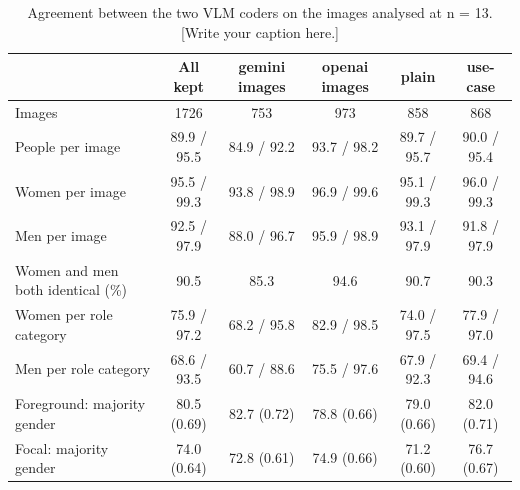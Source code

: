 \begin{table}[t]
\centering
\scriptsize

\begin{tabular}{@{}lccccc@{}}
\toprule
 & \textbf{All kept} & \textbf{gemini images} & \textbf{openai images} & \textbf{plain} & \textbf{use-case} \\
\midrule
Images & 1726 & 753 & 973 & 858 & 868 \\
People per image & 89.9 / 95.5 & 84.9 / 92.2 & 93.7 / 98.2 & 89.7 / 95.7 & 90.0 / 95.4 \\
Women per image & 95.5 / 99.3 & 93.8 / 98.9 & 96.9 / 99.6 & 95.1 / 99.3 & 96.0 / 99.3 \\
Men per image & 92.5 / 97.9 & 88.0 / 96.7 & 95.9 / 98.9 & 93.1 / 97.9 & 91.8 / 97.9 \\
Women and men both identical (\%) & 90.5 & 85.3 & 94.6 & 90.7 & 90.3 \\
Women per role category & 75.9 / 97.2 & 68.2 / 95.8 & 82.9 / 98.5 & 74.0 / 97.5 & 77.9 / 97.0 \\
Men per role category & 68.6 / 93.5 & 60.7 / 88.6 & 75.5 / 97.6 & 67.9 / 92.3 & 69.4 / 94.6 \\
Foreground: majority gender & 80.5 (0.69) & 82.7 (0.72) & 78.8 (0.66) & 79.0 (0.66) & 82.0 (0.71) \\
Focal: majority gender & 74.0 (0.64) & 72.8 (0.61) & 74.9 (0.66) & 71.2 (0.60) & 76.7 (0.67) \\
\bottomrule
\end{tabular}
\caption{Agreement between the two VLM coders on the images analysed at n = 13. [Write your caption here.]}
\label{tab:kept-agreement-n13}
\end{table}
